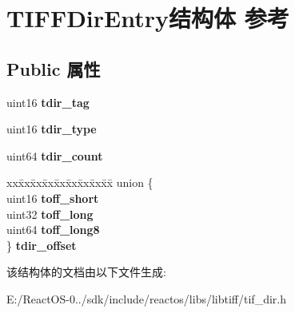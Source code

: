 \hypertarget{struct_t_i_f_f_dir_entry}{}\section{T\+I\+F\+F\+Dir\+Entry结构体 参考}
\label{struct_t_i_f_f_dir_entry}
\subsection*{Public 属性}
\begin{DoxyCompactItemize}
\item 
\mbox{\label{struct_t_i_f_f_dir_entry_a6444b9bc7ff0c3d5622d63c4e9bec062}} 
uint16 {\bfseries tdir\+\_\+tag}
\item 
\mbox{\label{struct_t_i_f_f_dir_entry_ae0ade52e3d978131a414eaccde5722c4}} 
uint16 {\bfseries tdir\+\_\+type}
\item 
\mbox{\label{struct_t_i_f_f_dir_entry_a4f048f28a6c2f29f38d4d22bd788c1ad}} 
uint64 {\bfseries tdir\+\_\+count}
\item 
\mbox{\label{struct_t_i_f_f_dir_entry_a15b0e96f3b92f43d9d6bfd59cbfc29d2}} 
\begin{tabbing}
xx\=xx\=xx\=xx\=xx\=xx\=xx\=xx\=xx\=\kill
union \{\\
\>uint16 {\bfseries toff\_short}\\
\>uint32 {\bfseries toff\_long}\\
\>uint64 {\bfseries toff\_long8}\\
\} {\bfseries tdir\_offset}\\

\end{tabbing}\end{DoxyCompactItemize}


该结构体的文档由以下文件生成\+:\begin{DoxyCompactItemize}
\item 
E\+:/\+React\+O\+S-\/0../sdk/include/reactos/libs/libtiff/tif\+\_\+dir.\+h\end{DoxyCompactItemize}
